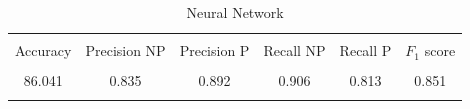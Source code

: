 \documentclass[journal,twocolumn]{IEEEtran}
\begin{document}
\begin{appendices}
\begin{table}[H]
\caption{Neural Network}
\centering
\begin{tabular}{cccccc}
\hline\\ [-1.5ex]
{Accuracy} & Precision NP & Precision P & Recall NP & Recall P & $F_1$ score \\ \hline\\ [-1.5ex]
86.041    &    0.835   &    0.892  &   0.906  &  0.813 & 0.851 \\ \hline\\ [-1.5ex]
\end{tabular}
\end{table}

\end{appendices}
\end{document}
